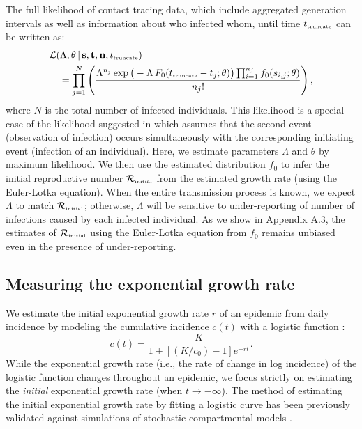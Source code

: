 \documentclass[12pt]{article}
\newcommand{\Rx}[1]{\ensuremath{{\mathcal R}_{#1}}\xspace}
\newcommand{\Rini}{\Rx{\textrm{\tiny initial}}}
\newcommand{\tsub}[2]{#1_{{\textrm{\tiny #2}}}}
\begin{document}
The full likelihood of contact tracing data, which include aggregated generation intervals as well as information about who infected whom, until time $\tsub{t}{truncate}$ can be written as:
\begin{equation}\label{eq:nonhomogeneous}
\begin{aligned}
&\mathcal{L}(\Lambda, \theta\,|\, \mathbf{s}, \mathbf{t}, \mathbf{n}, \tsub{t}{truncate})\\
&\quad=\prod_{j=1}^N \left(\frac{\Lambda^{n_j} \exp \big(- \Lambda\, F_0(\tsub{t}{truncate} - t_j ;\theta) \big) \prod_{i=1}^{n_j} f_0(s_{i, j}; \theta)}{n_j!} \right),
\end{aligned}
\end{equation}
where $N$ is the total number of infected individuals.
This likelihood is a special case of the likelihood suggested in \citep{kalbfleisch1989inference} which assumes that the second event (observation of infection) occurs simultaneously with the corresponding initiating event (infection of an individual).
Here, we estimate parameters $\Lambda$ and $\theta$ by maximum likelihood.
We then use the estimated distribution $f_0$ to infer the initial reproductive number $\Rini$ from the estimated growth rate (using the Euler-Lotka equation).
When the entire transmission process is known, we expect $\Lambda$ to match $\Rini$;
otherwise, $\Lambda$ will be sensitive to under-reporting of number of infections caused by each infected individual.
As we show in Appendix A.3, the estimates of $\Rini$ using the Euler-Lotka equation from $f_0$ remains unbiased even in the presence of under-reporting.

\subsection{Measuring the exponential growth rate}

We estimate the initial exponential growth rate $r$ of an epidemic from daily incidence by modeling the cumulative incidence $c(t)$ with a logistic function \citep{ma2014estimating}:
\begin{equation}
c(t) = \frac{K}{1 + \left[(K/c_0)-1\right]e^{-rt}}.
\end{equation}
While the exponential growth rate (i.e., the rate of change in log incidence) of the logistic function changes throughout an epidemic,
we focus strictly on estimating the \emph{initial} exponential growth rate (when $t \to -\infty$).
The method of estimating the initial exponential growth rate by fitting a logistic curve has been previously validated against simulations of stochastic compartmental models \citep{ma2014estimating}.
\end{document}

